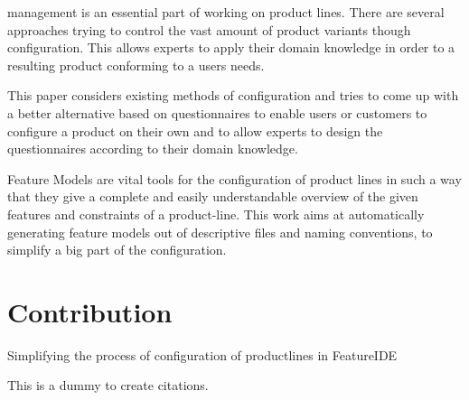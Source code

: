 % 
% 
% 
% 
 management is an essential part of working on product lines. There are several approaches trying to control the vast amount of product variants though configuration. This allows experts to apply their domain knowledge in order to a resulting product conforming to a users needs.

This paper considers existing methods of configuration and tries to come up with a better alternative based on questionnaires to enable users or customers to configure a product on their own and to allow experts to design the questionnaires according to their domain knowledge.

Feature Models are vital tools for the configuration of product lines in such a way that they give a complete and easily understandable overview of the given features and constraints of a product-line. This work aims at automatically generating feature models out of descriptive files and naming conventions, to simplify a big part of the configuration.


\section*{Contribution}

Simplifying the process of configuration of productlines in FeatureIDE

This\cite{fpe} is\cite{qdc} a\cite{qbvm} dummy to create citations.